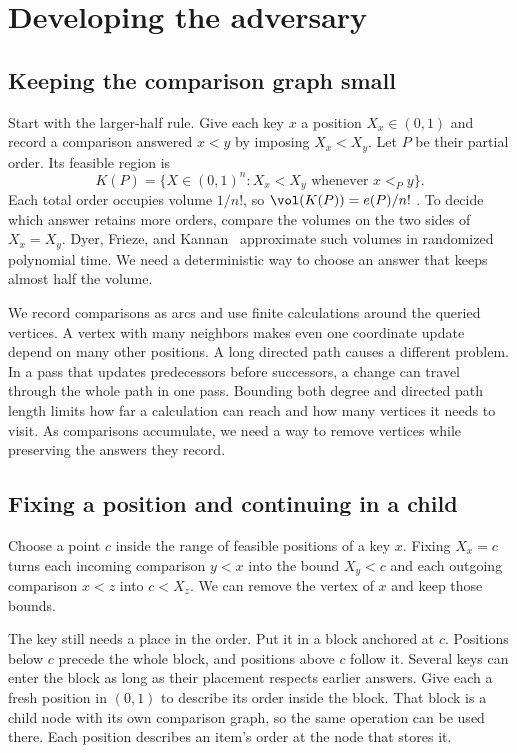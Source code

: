 \section{Developing the adversary}\label{sec:development}

\subsection{Keeping the comparison graph small}

Start with the larger-half rule. Give each key $x$ a position
$X_x\in(0,1)$ and record a comparison answered $x<y$ by imposing
$X_x<X_y$. Let $P$ be their partial order. Its feasible region is
\[
K(P)=\{X\in(0,1)^n:X_x<X_y\text{ whenever }x<_P y\}.
\]
Each total order occupies volume $1/n!$, so $\vol(K(P))=e(P)/n!$
\cite{stanley}. To decide which answer retains more orders, compare the
volumes on the two sides of $X_x=X_y$.
Dyer, Frieze, and Kannan~\cite{dfk} approximate such volumes in
randomized polynomial time. We need a deterministic way to choose an
answer that keeps almost half the volume.

We record comparisons as arcs and use finite calculations around the
queried vertices. A vertex with many neighbors makes even one
coordinate update depend on many other positions. A long directed path
causes a different problem. In a pass that updates predecessors before
successors, a change can travel through the whole path in one pass.
Bounding both degree and directed path length limits how far a
calculation can reach and how many vertices it needs to visit.
As comparisons accumulate, we need a way to remove vertices while
preserving the answers they record.

\subsection{Fixing a position and continuing in a child}

Choose a point $c$ inside the range of feasible positions of a key $x$.
Fixing $X_x=c$ turns each incoming comparison $y<x$ into the bound
$X_y<c$ and each outgoing comparison $x<z$ into $c<X_z$. We can
remove the vertex of $x$ and keep those bounds.

The key still needs a place in the order. Put it in a block anchored
at $c$. Positions below $c$ precede the whole block, and positions above
$c$ follow it. Several keys can enter the block as long as their
placement respects earlier answers. Give each a fresh position in
$(0,1)$ to describe its order inside the block. That block is a child
node with its own comparison graph, so the same operation can be used
there. Each position describes an item's order at the node that stores
it.

